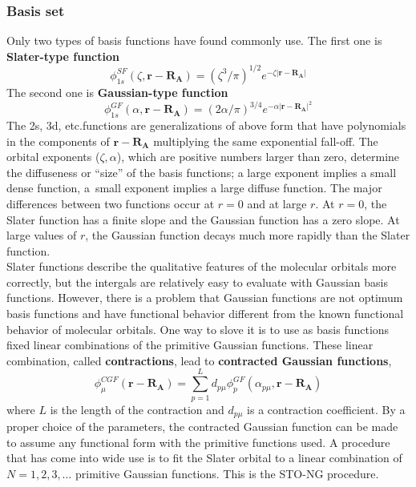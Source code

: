 \documentclass[11pt]{article}
\begin{document}
\subsubsection{Basis set}
Only two types of basis functions have found commonly use. The first one is \textbf{Slater-type function}
\begin{equation}
    \phi_{1s}^{SF}(\zeta,\mathbf{r-R_A})={(\zeta^3/\pi)}^{1/2}e^{-\zeta \lvert \mathbf{r-R_A} \rvert}
\end{equation}
The second one is \textbf{Gaussian-type function}
\begin{equation}
    \phi_{1s}^{GF}(\alpha,\mathbf{r-R_A})={(2\alpha/\pi)}^{3/4}e^{-\alpha {\lvert \mathbf{r-R_A} \rvert}^2}
\end{equation}
The 2s, 3d, etc.functions are generalizations of above form that have polynomials in the components of $\mathbf{r-R_A}$
multiplying the same exponential fall-off. The orbital exponents ($\zeta, \alpha$), which are positive numbers larger than
zero, determine the diffuseness or ``size'' of the basis functions; a large exponent implies a small dense function, a\
small exponent implies a large diffuse function. The major differences between two functions occur at $r=0$ and at large $r$.
At $r=0$, the Slater function has a finite slope and the Gaussian function has a zero slope. At large values of $r$, the
Gaussian function decays much more rapidly than the Slater function.\\
Slater functions describe the qualitative features of the molecular orbitals more correctly, but the intergals are relatively
easy to evaluate with Gaussian basis functions. However, there is a problem that Gaussian functions are not optimum basis functions
and have functional behavior different from the known functional behavior of molecular orbitals. One way to slove it is to use 
as basis functions fixed linear combinations of the primitive Gaussian functions. These linear combination, called \textbf{contractions},
lead to \textbf{contracted Gaussian functions},
\begin{equation}
    \phi_\mu^{CGF}(\mathbf{r-R_A})=\sum_{p=1}^{L}d_{p\mu}\phi_{p}^{GF}(\alpha_{p\mu}, \mathbf{r-R_A})
\end{equation}
where $L$ is the length of the contraction and $d_{p\mu}$ is a contraction coefficient. By a proper choice of the parameters, the
contracted Gaussian function can be made to assume any functional form with the primitive functions used. A procedure that has come into
wide use is to fit the Slater orbital to a linear combination of $N=1,2,3,\ldots$ primitive Gaussian functions. This is the STO-NG procedure.\\
\end{document}
